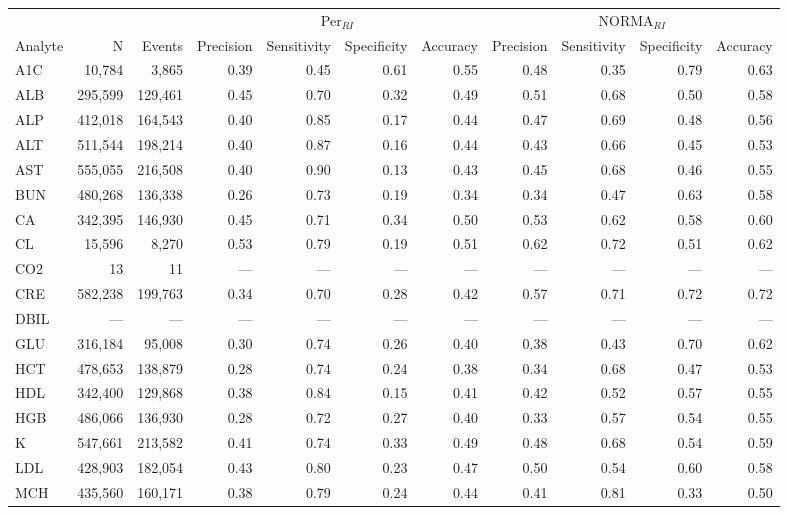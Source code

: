 \begin{table}[ht]
\centering
\footnotesize
\begin{tabular}{lrrrrrrrrrr}
\toprule
 & &  & \multicolumn{4}{c}{Per$_{RI}$} & \multicolumn{4}{c}{NORMA$_{RI}$} \\
\cmidrule(lr){4-7} \cmidrule(lr){8-11}
Analyte & N & Events & Precision & Sensitivity & Specificity & Accuracy & Precision & Sensitivity & Specificity & Accuracy \\
\midrule
A1C & 10,784 & 3,865 & 0.39 & 0.45 & 0.61 & 0.55 & 0.48 & 0.35 & 0.79 & 0.63 \\
ALB & 295,599 & 129,461 & 0.45 & 0.70 & 0.32 & 0.49 & 0.51 & 0.68 & 0.50 & 0.58 \\
ALP & 412,018 & 164,543 & 0.40 & 0.85 & 0.17 & 0.44 & 0.47 & 0.69 & 0.48 & 0.56 \\
ALT & 511,544 & 198,214 & 0.40 & 0.87 & 0.16 & 0.44 & 0.43 & 0.66 & 0.45 & 0.53 \\
AST & 555,055 & 216,508 & 0.40 & 0.90 & 0.13 & 0.43 & 0.45 & 0.68 & 0.46 & 0.55 \\
BUN & 480,268 & 136,338 & 0.26 & 0.73 & 0.19 & 0.34 & 0.34 & 0.47 & 0.63 & 0.58 \\
CA & 342,395 & 146,930 & 0.45 & 0.71 & 0.34 & 0.50 & 0.53 & 0.62 & 0.58 & 0.60 \\
CL & 15,596 & 8,270 & 0.53 & 0.79 & 0.19 & 0.51 & 0.62 & 0.72 & 0.51 & 0.62 \\
CO2 & 13 & 11 & --- & --- & --- & --- & --- & --- & --- & --- \\
CRE & 582,238 & 199,763 & 0.34 & 0.70 & 0.28 & 0.42 & 0.57 & 0.71 & 0.72 & 0.72 \\
DBIL & --- & --- & --- & --- & --- & --- & --- & --- & --- & --- \\
GLU & 316,184 & 95,008 & 0.30 & 0.74 & 0.26 & 0.40 & 0.38 & 0.43 & 0.70 & 0.62 \\
HCT & 478,653 & 138,879 & 0.28 & 0.74 & 0.24 & 0.38 & 0.34 & 0.68 & 0.47 & 0.53 \\
HDL & 342,400 & 129,868 & 0.38 & 0.84 & 0.15 & 0.41 & 0.42 & 0.52 & 0.57 & 0.55 \\
HGB & 486,066 & 136,930 & 0.28 & 0.72 & 0.27 & 0.40 & 0.33 & 0.57 & 0.54 & 0.55 \\
K & 547,661 & 213,582 & 0.41 & 0.74 & 0.33 & 0.49 & 0.48 & 0.68 & 0.54 & 0.59 \\
LDL & 428,903 & 182,054 & 0.43 & 0.80 & 0.23 & 0.47 & 0.50 & 0.54 & 0.60 & 0.58 \\
MCH & 435,560 & 160,171 & 0.38 & 0.79 & 0.24 & 0.44 & 0.41 & 0.81 & 0.33 & 0.50 \\

\end{tabular}
\end{table}
